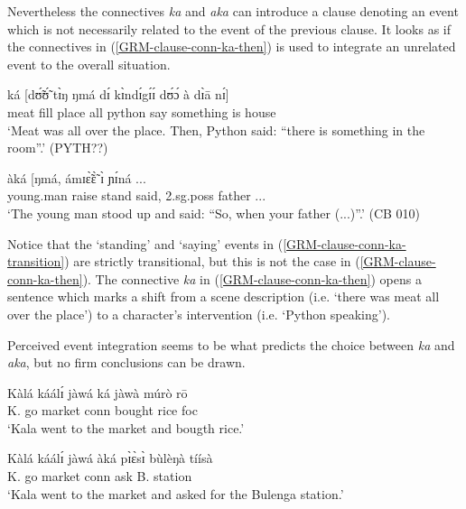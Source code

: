 Nevertheless the connectives  {\it ka} and {\it aka}  can 
introduce a clause denoting an event
which is not necessarily related to the event of the previous clause. It looks
as if  the connectives in (\ref{GRM-clause-conn-ka-then}) is used to
integrate an unrelated event to  the overall situation.   

\ea\label{GRM-clause-conn-ka-then} 
\gll [{nànsá sú bárá múŋ̀.}] ká [dʊ̃́ʊ̃́ tɪ̀ŋ ŋmá dɪ́ kɪ̀ndɪ́gɪ́ɪ́ 
dʊ́ɔ́ à dɪ̀ā nɪ́]\\
{meat fill place all} {\conn} python {\art} say {\comp} something is  {\art}
house {\postp}\\
\glt `Meat was all over the place. Then,  Python said: ``there is something in
the room''.' (PYTH??)
 \z

\ea\label{GRM-clause-conn-ka-transition} 
\gll  [à     bìpɔ̀lɪ́ɪ́     sìì           tʃɪ́ŋá]     àká   [ŋmá,  
ámɪɛ̃̀ɛ̃̀   ɪ̀               ɲɪ́ná  {...} \\
{\art} young.man      raise   stand {\conn} said,  {\adv}   {\sc 2.sg.poss} 
father  {...}\\
\glt `The young man stood up and said:  ``So, when your father (...)''.' (CB
010)
 \z

Notice that the `standing' and `saying' events in
(\ref{GRM-clause-conn-ka-transition}) are strictly transitional, but this is not
the case in (\ref{GRM-clause-conn-ka-then}). The connective {\it ka} in
(\ref{GRM-clause-conn-ka-then}) opens a sentence which marks a shift from a
scene description (i.e.  `there was meat all over the place') to a character's
intervention (i.e. `Python speaking').  

Perceived event integration  seems to be what predicts the choice between 
{\it ka} and {\it aka}, but no firm conclusions can be drawn. 

\ea\label{GRM-ev-int-1} 

\ea\label{GRM-ev-int-1-ka} 
\gll Kàlá káálɪ́ jàwá ká jàwà múrò rō\\
K. go market {\sc conn} bought rice {\sc foc}\\
\glt  `Kala went to the market and bougth rice.'

\ex\label{GRM-ev-int-1-aka} 
\gll  Kàlá káálɪ́ jàwá àká pɪ̀ɛ̀sɪ̀ bùlèŋà tíísà\\
K. go market {\sc conn} ask B. station\\
\glt  `Kala went to the market and asked for the Bulenga station.' 

\z 
 \z


